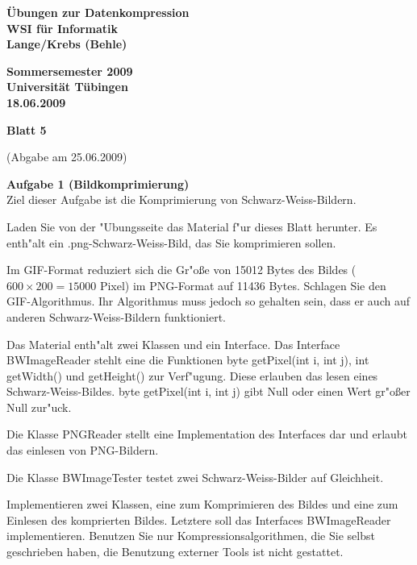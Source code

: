 \documentclass[a4paper]{article}
\def\header#1#2#3#4{\pagestyle{empty}
\noindent
\begin{minipage}[t]{0.6\textwidth}
\begin{flushleft}
\bf \"Ubungen zur Datenkompression\\
WSI f\"ur Informatik\\
Lange/Krebs (Behle)
\end{flushleft}
\end{minipage}
\begin{minipage}[t]{0.4\textwidth}
\begin{flushright}
\bf Sommersemester 2009\\
Universit\"at T\"ubingen\\
#2 %
\end{flushright}
\end{minipage}

\begin{center}
{\Large\bf Blatt #1}

{(Abgabe am #3)}
\end{center}
}
\begin{document}
\header{5}{18.06.2009}{25.06.2009}{}

\bigskip

{\bf Aufgabe 1  \quad(Bildkomprimierung)}\\
Ziel dieser Aufgabe ist die Komprimierung von Schwarz-Weiss-Bildern.

Laden Sie von der "Ubungsseite das Material f"ur dieses Blatt herunter. Es enth"alt ein {\rm .png}-Schwarz-Weiss-Bild, das Sie komprimieren sollen.

Im GIF-Format reduziert sich die Gr"o{\ss}e von 15012 Bytes des Bildes ($600 \times 200=15000$ Pixel) im PNG-Format auf 11436 Bytes. Schlagen Sie den GIF-Algorithmus. Ihr Algorithmus muss jedoch so gehalten sein, dass er auch auf anderen Schwarz-Weiss-Bildern funktioniert.

Das Material enth"alt zwei Klassen und ein Interface. Das Interface {\rm BWImageReader} stehlt eine die Funktionen {\rm byte getPixel(int i, int j)}, {\rm int getWidth()} und {\rm getHeight()} zur Verf"ugung. Diese erlauben das lesen eines  Schwarz-Weiss-Bildes. {\rm byte getPixel(int i, int j)} gibt Null oder einen Wert gr"o{\ss}er Null zur"uck.

Die Klasse {\rm PNGReader} stellt eine Implementation des Interfaces dar und erlaubt das einlesen von PNG-Bildern.

Die Klasse {\rm BWImageTester} testet zwei Schwarz-Weiss-Bilder auf Gleichheit.

Implementieren zwei Klassen, eine zum Komprimieren des Bildes und eine zum Einlesen des komprierten Bildes. Letztere soll das Interfaces {\rm BWImageReader} implementieren. Benutzen Sie nur Kompressionsalgorithmen, die Sie selbst geschrieben haben, die Benutzung externer Tools ist nicht gestattet.
\end{document}
